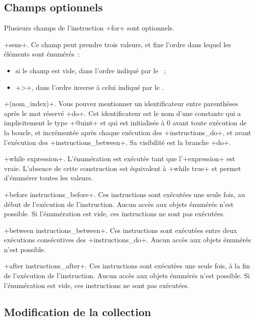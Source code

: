 \subsection{Champs optionnels}

Plusieurs champs de l'instruction \ggst+for+ sont optionnels.


\ggst+sens+. Ce champ peut prendre trois valeurs, et fixe l'ordre dans lequel les éléments sont énumérés~:
\begin{itemize}
  \item si le champ est vide, dans l'ordre indiqué par le ~;
  \item \ggst+>+, dans l'ordre inverse à celui indiqué par le .
\end{itemize}


\ggst+(nom_index)+. Vous pouvez mentionner un identificateur entre parenthèses après le mot réservé \ggst+do+. Cet identificateur est le nom d'une constante qui a implicitement le type \ggst+@uint+ et qui est initialisée à 0 avant toute exécution de la boucle, et incrémentée après chaque exécution des \ggst+instructions_do+, et avant l'exécution des \ggst+instructions_between+. Sa visibilité est la branche \ggst+do+.

\ggst+while expression+. L'énumération est exécutée tant que l'\ggst+expression+ est vraie. L'absence de cette construction est équivalent à \ggst+while true+ et permet d'énumérer toutes les valeurs.


\ggst+before instructions_before+. Ces instructions sont exécutées une seule fois, au début de l'exécution de l'instruction. Aucun accès aux objets énumérés n'est possible. Si l'énumération est vide, ces instructions ne sont pas exécutées.

\ggst+between instructions_between+. Ces instructions sont exécutées entre deux exécutions consécutives des \ggst+instructions_do+. Aucun accès aux objets énumérés n'est possible.

\ggst+after instructions_after+. Ces instructions sont exécutées une seule fois, à la fin de l'exécution de l'instruction. Aucun accès aux objets énumérés n'est possible. Si l'énumération est vide, ces instructions ne sont pas exécutées.


\subsection{Modification de la collection}


